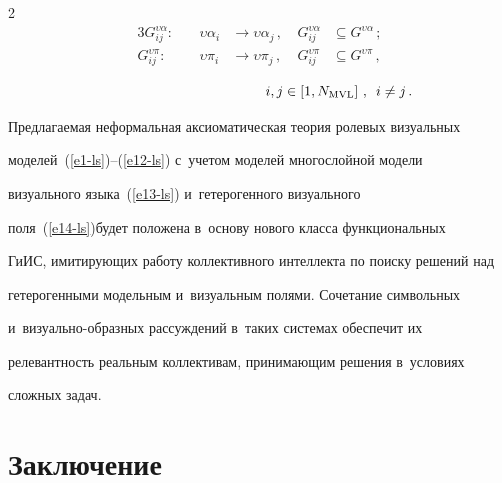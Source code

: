 \begin{multicols}{2}
\begin{alignat*}{3}
  G_{ij}^{\upsilon\alpha}:\ &&\upsilon\alpha_i&\to \upsilon\alpha_j\,,\ 


&G_{ij}^{\upsilon\alpha} &\subseteq G^{\upsilon\alpha}\,;\\


  G_{ij}^{\upsilon\pi}:\ &&\upsilon\pi_i&\to \upsilon\pi_j\,,\ &G_{ij}^{\upsilon\pi} 


&\subseteq G^{\upsilon\pi}\,, 


\end{alignat*}





\vspace*{-6pt}





\noindent


$$


  \hspace*{40mm}i,j\in \left[1, N_{\mathrm{MVL}}\right]\,,\enskip i\not=j\,.


  $$


 


  


  Предлагаемая неформальная аксиоматическая тео\-рия ролевых визуальных 


моделей~(\ref{e1-ls})--(\ref{e12-ls}) с~учетом моделей многослойной модели 


визуального языка~(\ref{e13-ls}) и~гетерогенного визуального  


поля~(\ref{e14-ls})\linebreak будет положена в~основу нового класса функциональных 


ГиИС, имитирующих работу коллек\-тивного интеллекта по поиску решений над 


ге\-те\-ро\-генными модельным и~визуальным полями. \mbox{Сочетание} символьных 


и~ви\-зу\-аль\-но-об\-раз\-ных рассуждений в~таких системах обеспечит их 


релевантность реальным коллективам, принимающим решения в~условиях 


сложных задач.





\vspace*{-3pt}


  


\section{Заключение}






\end{multicols}
